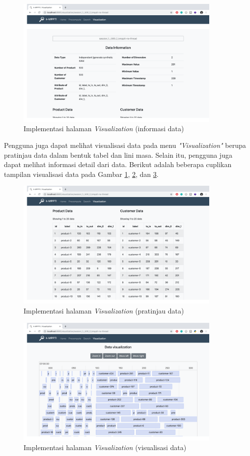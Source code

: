 \begin{figure}[H]
	\centering
	\includegraphics[width=10cm]{assets/img/bab4/data-info.png}
	\caption{Implementasi halaman \textit{Visualization} (informasi data)}
	\label{fig:visual-data-info}
\end{figure}

Pengguna juga dapat melihat visualisasi data pada menu \textit{"Visualization"} berupa pratinjau data dalam bentuk tabel dan lini masa. Selain itu, pengguna juga dapat melihat informasi detail dari data. Berikut adalah beberapa cuplikan tampilan visualisasi data pada Gambar \ref{fig:visual-data-info}, \ref{fig:visual-table}, dan \ref{fig:visual-timeline}.


\begin{figure}[H]
	\centering
	\includegraphics[width=10cm]{assets/img/bab4/visual-table.png}
	\caption{Implementasi halaman \textit{Visualization} (pratinjau data)}
	\label{fig:visual-table}
\end{figure}

\begin{figure}[H]
	\centering
	\includegraphics[width=10cm]{assets/img/bab4/visual-timeline.png}
	\caption{Implementasi halaman \textit{Visualization} (visualisasi data)}
	\label{fig:visual-timeline}
\end{figure}
